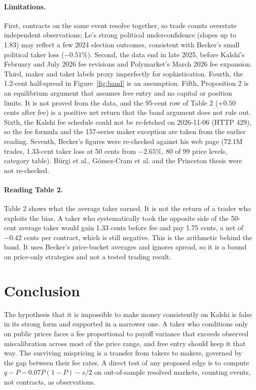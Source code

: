 \documentclass[11pt]{article}
\begin{document}
\paragraph{Limitations.} First, contracts on the same event resolve together, so trade counts overstate independent observations; Le's strong political underconfidence (slopes up to 1.83) may reflect a few 2024 election outcomes, consistent with Becker's small political taker loss ($-0.51\%$). Second, the data end in late 2025, before Kalshi's February and July 2026 fee revisions and Polymarket's March 2026 fee expansion. Third, maker and taker labels proxy imperfectly for sophistication. Fourth, the 1.2-cent half-spread in Figure~\ref{fig:band} is an assumption. Fifth, Proposition 2 is an equilibrium argument that assumes free entry and no capital or position limits. It is not proved from the data, and the 95-cent row of Table 2 ($+0.50$ cents after fee) is a positive net return that the band argument does not rule out. Sixth, the Kalshi fee schedule could not be re-fetched on 2026-11-06 (HTTP 429), so the fee formula and the 157-series maker exception are taken from the earlier reading. Seventh, Becker's figures were re-checked against his web page (72.1M trades, 1.33-cent taker loss at 50 cents from $-2.65\%$, 80 of 99 price levels, category table). B\"urgi et al., G\'omez-Cram et al. and the Princeton thesis were not re-checked.

\paragraph{Reading Table 2.} Table 2 shows what the average taker earned. It is not the return of a trader who exploits the bias. A taker who systematically took the opposite side of the 50-cent average taker would gain 1.33 cents before fee and pay 1.75 cents, a net of $-0.42$ cents per contract, which is still negative. This is the arithmetic behind the band. It uses Becker's price-bucket averages and ignores spread, so it is a bound on price-only strategies and not a tested trading result.

\section{Conclusion}

The hypothesis that it is impossible to make money consistently on Kalshi is false in its strong form and supported in a narrower one. A taker who conditions only on public prices faces a fee proportional to payoff variance that exceeds observed miscalibration across most of the price range, and free entry should keep it that way. The surviving mispricing is a transfer from takers to makers, governed by the gap between their fee rates. A direct test of any proposed edge is to compute $q-P-0.07P(1-P)-s/2$ on out-of-sample resolved markets, counting events, not contracts, as observations.
\end{document}

